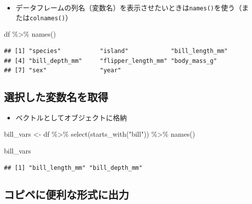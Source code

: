 \documentclass[
  xelatex,ja=standard, b5paper]{bxjsbook}
\newenvironment{Shaded}{\begin{snugshade}}{\end{snugshade}}
\newcommand{\FunctionTok}[1]{\textcolor[rgb]{0.00,0.00,0.00}{#1}}
\newcommand{\NormalTok}[1]{#1}
\newcommand{\OtherTok}[1]{\textcolor[rgb]{0.56,0.35,0.01}{#1}}
\newcommand{\SpecialCharTok}[1]{\textcolor[rgb]{0.00,0.00,0.00}{#1}}
\newcommand{\StringTok}[1]{\textcolor[rgb]{0.31,0.60,0.02}{#1}}
\providecommand{\tightlist}{%
  \setlength{\itemsep}{0pt}\setlength{\parskip}{0pt}}
\begin{document}
\begin{itemize}
\tightlist
\item
  データフレームの列名（変数名）を表示させたいときは\texttt{names()}を使う（または\texttt{colnames()}）
\end{itemize}

\begin{Shaded}
\begin{Highlighting}[]
\NormalTok{df }\SpecialCharTok{\%\textgreater{}\%} \FunctionTok{names}\NormalTok{()}
\end{Highlighting}
\end{Shaded}

\begin{verbatim}
## [1] "species"           "island"            "bill_length_mm"   
## [4] "bill_depth_mm"     "flipper_length_mm" "body_mass_g"      
## [7] "sex"               "year"
\end{verbatim}

\hypertarget{select-get-obj}{%
\subsection{選択した変数名を取得}\label{select-get-obj}}

\begin{itemize}
\tightlist
\item
  ベクトルとしてオブジェクトに格納
\end{itemize}

\begin{Shaded}
\begin{Highlighting}[]
\NormalTok{bill\_vars }\OtherTok{\textless{}{-}} 
\NormalTok{  df }\SpecialCharTok{\%\textgreater{}\%} 
  \FunctionTok{select}\NormalTok{(}\FunctionTok{starts\_with}\NormalTok{(}\StringTok{"bill"}\NormalTok{)) }\SpecialCharTok{\%\textgreater{}\%} 
  \FunctionTok{names}\NormalTok{()}

\NormalTok{bill\_vars}
\end{Highlighting}
\end{Shaded}

\begin{verbatim}
## [1] "bill_length_mm" "bill_depth_mm"
\end{verbatim}

\hypertarget{select-get-out}{%
\subsection{コピペに便利な形式に出力}\label{select-get-out}}
\end{document}
